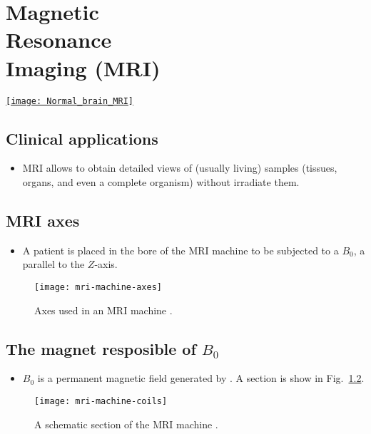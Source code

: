 \chapter[\gls{MRI}]{Magnetic\\Resonance\\Imaging (MRI)}
\vspace{-50ex}
\begin{flushright}
\href{https://www.sciencephoto.com/media/728494/view/normal-brain-mri}{\texttt{[image: Normal\_brain\_MRI]}}
\end{flushright}

\section{Clinical applications}
\begin{itemize}
\item \gls{MRI}
  \cite{westbrook2018mri,Wu2022MRI_Physics,thePIRL2018NMR_basics,thePIRL2018SpinEcho,thePIRL2018Fourier,thePIRL2018GRE}
  allows to obtain detailed views of (usually living) samples
  (tissues, organs, and even a complete organism) without irradiate
  them.
\end{itemize}

\section{MRI axes}
\begin{itemize}
\item A patient is placed in the bore of the MRI machine to be
  subjected to a $B_0$, a  parallel to the $Z$-axis.
\end{itemize}
\vspace{-4ex}
\begin{figure}[!b]
  \centering
  \texttt{[image: mri-machine-axes]}
  \caption{Axes used in an MRI machine \cite{abdulla2025MRI_machine}.}
  \label{fig:MRI_axes}
\end{figure}

\section{The magnet resposible of $B_0$}
\begin{itemize}
\item $B_0$ is a permanent magnetic field generated by . A section is
  show in Fig.~\ref{fig:MRI_machine_scheme}.
\end{itemize}
\vspace{-4ex}
\begin{figure}[!b]
  \centering
  \texttt{[image: mri-machine-coils]}
  \caption{A schematic section of the MRI machine \cite{abdulla2025MRI_machine}.}
  \label{fig:MRI_machine_scheme}
\end{figure}

